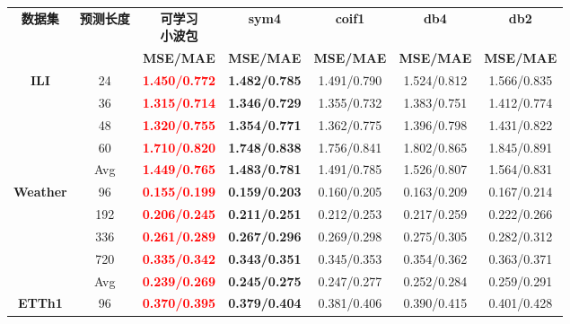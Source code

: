\begin{table}[!htbp]
\centering
\small
\setlength{\tabcolsep}{2.2pt}
\renewcommand{\arraystretch}{0.96}
\label{tab:chap4-sensitivity-wavelet}
\begin{tabular}{c|c|c|c|c|c|c}
\toprule
\multirow{2}{*}{\textbf{数据集}} &
\multirow{2}{*}{\textbf{预测长度}} &
\makecell{\textbf{可学习}\\\textbf{小波包}} &
\textbf{sym4} &
\textbf{coif1} &
\textbf{db4} &
\textbf{db2} \\
\cmidrule(lr){3-7}
& & \textbf{MSE/MAE} & \textbf{MSE/MAE} & \textbf{MSE/MAE} & \textbf{MSE/MAE} & \textbf{MSE/MAE} \\
\midrule
\multirow{5}{*}{\textbf{ILI}}
& 24 & \textbf{\textcolor{red}{1.450/0.772}} & \textbf{1.482/0.785} & 1.491/0.790 & 1.524/0.812 & 1.566/0.835 \\
& 36 & \textbf{\textcolor{red}{1.315/0.714}} & \textbf{1.346/0.729} & 1.355/0.732 & 1.383/0.751 & 1.412/0.774 \\
& 48 & \textbf{\textcolor{red}{1.320/0.755}} & \textbf{1.354/0.771} & 1.362/0.775 & 1.396/0.798 & 1.431/0.822 \\
& 60 & \textbf{\textcolor{red}{1.710/0.820}} & \textbf{1.748/0.838} & 1.756/0.841 & 1.802/0.865 & 1.845/0.891 \\
& Avg & \textbf{\textcolor{red}{1.449/0.765}} & \textbf{1.483/0.781} & 1.491/0.785 & 1.526/0.807 & 1.564/0.831 \\
\midrule
\multirow{5}{*}{\textbf{Weather}}
& 96 & \textbf{\textcolor{red}{0.155/0.199}} & \textbf{0.159/0.203} & 0.160/0.205 & 0.163/0.209 & 0.167/0.214 \\
& 192 & \textbf{\textcolor{red}{0.206/0.245}} & \textbf{0.211/0.251} & 0.212/0.253 & 0.217/0.259 & 0.222/0.266 \\
& 336 & \textbf{\textcolor{red}{0.261/0.289}} & \textbf{0.267/0.296} & 0.269/0.298 & 0.275/0.305 & 0.282/0.312 \\
& 720 & \textbf{\textcolor{red}{0.335/0.342}} & \textbf{0.343/0.351} & 0.345/0.353 & 0.354/0.362 & 0.363/0.371 \\
& Avg & \textbf{\textcolor{red}{0.239/0.269}} & \textbf{0.245/0.275} & 0.247/0.277 & 0.252/0.284 & 0.259/0.291 \\
\midrule
\multirow{5}{*}{\textbf{ETTh1}}
& 96 & \textbf{\textcolor{red}{0.370/0.395}} & \textbf{0.379/0.404} & 0.381/0.406 & 0.390/0.415 & 0.401/0.428 \\

\end{tabular}
\end{table}
